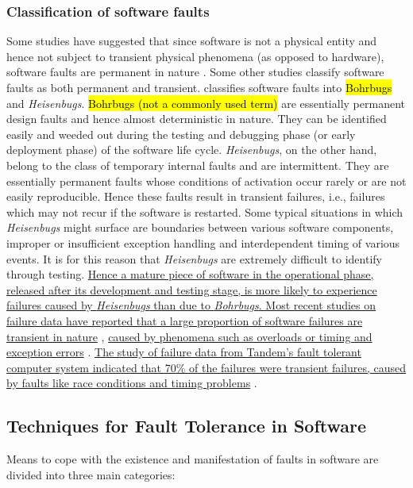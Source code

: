 \documentclass[a4paper, 11pt]{article}
\begin{document}
\subsubsection{Classification of software faults}
Some studies have suggested that since software is not a physical entity and hence not subject to transient physical phenomena (as opposed to hardware), software faults are permanent in nature \citep{huang1994two}. Some other studies classify software faults as both permanent and transient. \citet{gray1986computers} classifies software faults into \hl{Bohrbugs} and \emph{Heisenbugs}. \hl{Bohrbugs (not a commonly used term)} are essentially permanent design faults and hence almost deterministic in nature. They can be identified easily and weeded out during the testing and debugging phase (or early deployment phase) of the software life cycle. \emph{Heisenbugs}, on the other hand, belong to the class of temporary internal faults and are intermittent. They are essentially permanent faults whose conditions of activation occur rarely or are not easily reproducible. Hence these faults result in transient failures, i.e., failures which may not recur if the software is restarted. Some typical situations in which \emph{Heisenbugs} might surface are boundaries between various software components, improper or insufficient exception handling and interdependent timing of various events. It is for this reason that \emph{Heisenbugs} are extremely difficult to identify through testing. \ul{Hence a mature piece of software in the operational phase, released after its development and testing stage, is more likely to experience failures caused by \emph{Heisenbugs} than due to \emph{Bohrbugs}. Most recent studies on failure data have reported that a large proportion of software failures are transient in nature} \citep{gray1986computers, gray1990census}, \ul{caused by phenomena such as overloads or timing and exception errors} \citep{chillarege1995measurement, sullivan1991software}. \ul{The study of failure data from Tandem's fault tolerant computer system indicated that 70\% of the failures were transient failures, caused by faults like race conditions and timing problems} \citep{lee1994software, lee1995software}.

\subsection{Techniques for Fault Tolerance in Software}
Means to cope with the existence and manifestation of faults in software are divided into three main categories:
\end{document}
